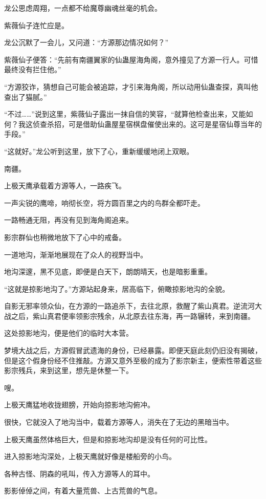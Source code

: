 \begin{this_body}
龙公思虑周翔，一点都不给魔尊幽魂丝毫的机会。

紫薇仙子连忙应是。

龙公沉默了一会儿，又问道：“方源那边情况如何？”

紫薇仙子便答：“先前有南疆翼家的仙蛊屋海角阁，意外撞见了方源一行人。可惜最终没有拦住他。”

“方源狡诈，猜想自己可能会被追踪，才引来海角阁，所以动用仙蛊查探，真叫他查出了猫腻。”

“不过……”说到这里，紫薇仙子露出一抹自信的笑容，“就算他检查出来，又能如何？我这侦查杀招，可是借助仙蛊屋星宿棋盘催使出来的。这可是星宿仙尊当年的手段。”

“这就好。”龙公听到这里，放下了心，重新缓缓地闭上双眼。

南疆。

上极天鹰承载着方源等人，一路疾飞。

一声尖锐的鹰啼，响彻长空，将方圆百里之内的鸟群全都吓走。

一路畅通无阻，再没有见到海角阁追来。

影宗群仙也稍微地放下了心中的戒备。

一道地沟，渐渐地展现在了众人的视野当中。

地沟深邃，黑不见底，即便是白天下，朗朗晴天，也是暗影重重。

“这就是掠影地沟了。”方源站起身来，居高临下，俯瞰掠影地沟的全貌。

自影无邪率领众仙，在方源的一路追杀下，去往北原，救醒了紫山真君。逆流河大战之后，紫山真君便率领影宗残余，从北原去往东海，再一路辗转，来到南疆。

这处掠影地沟，便是他们的临时大本营。

梦境大战之后，方源假冒武遗海的身份，已经暴露。即便天庭此刻仍旧没有揭破，但是这个假身份经不住推敲。方源又意外至极的成为了影宗新主，便索性带着这些影宗残兵，来到这里，想先是休整一下。

嗖。

上极天鹰猛地收拢翅膀，开始向掠影地沟俯冲。

很快，它就没入了地沟当中，载着方源等人，消失在了无边的黑暗当中。

上极天鹰虽然体格巨大，但是和掠影地沟却是没有任何的可比性。

进入掠影地沟深处，上极天鹰就好像是楼船旁的小鸟。

各种古怪、阴森的吼叫，传入方源等人的耳中。

影影倬倬之间，有着大量荒兽、上古荒兽的气息。


\end{this_body}
